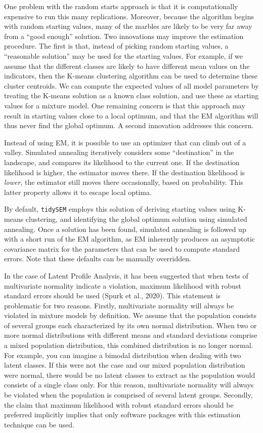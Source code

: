 \documentclass[
  ,man]{apa6}
\begin{document}
One problem with the random starts approach is that
it is computationally expensive to run this many replications.
Moreover, because the algorithm begins with random starting values,
many of the marbles are likely to be very far away from a ``good enough'' solution.
Two innovations may improve the estimation procedure.
The first is that, instead of picking random starting values,
a ``reasonable solution'' may be used for the starting values.
For example, if we assume that the different classes are likely to have different mean values on the indicators,
then the K-means clustering algorithm can be used to determine these cluster centroids.
We can compute the expected values of all model parameters by treating the K-means solution as a known class solution,
and use these as starting values for a mixture model.
One remaining concern is that this approach may result in starting values close to a local optimum,
and that the EM algorithm will thus never find the global optimum.
A second innovation addresses this concern.

Instead of using EM, it is possible to use an optimizer that can climb out of a valley.
Simulated annealing iteratively considers some ``destination'' in the landscape,
and compares its likelihood to the current one. If the destination likelihood is higher,
the estimator moves there.
If the destination likelihood is \emph{lower}, the estimator still moves there occasionally, based on probability.
This latter property allows it to escape local optima.

By default, \texttt{tidySEM} employs this solution of deriving starting values using K-means clustering,
and identifying the global optimum solution using simulated annealing.
Once a solution has been found,
simulated annealing is followed up with a short run of the EM algorithm,
as EM inherently produces an asymptotic covariance matrix for the parameters that can be used to compute standard errors.
Note that these defaults can be manually overridden.

In the case of Latent Profile Analysis, it has been suggested that when tests of multivariate normality indicate a violation,
maximum likelihood with robust standard errors should be used (Spurk et al., 2020).
This statement is problematic for two reasons.
Firstly, multivariate normality will always be violated in mixture models by definition.
We assume that the population consists of several groups each characterized by its own normal distribution.
When two or more normal distributions with different means and standard deviations comprise a mixed population distribution,
this combined distribution is no longer normal.
For example, you can imagine a bimodal distribution when dealing with two latent classes.
If this were not the case and our mixed population distribution were normal,
there would be no latent classes to extract as the population would consists of a single class only.
For this reason, multivariate normality will always be violated when the population is comprised of several latent groups.
Secondly, the claim that maximum likelihood with robust standard errors should be preferred
implicitly implies that only software packages with this estimation technique can be used.
\end{document}
